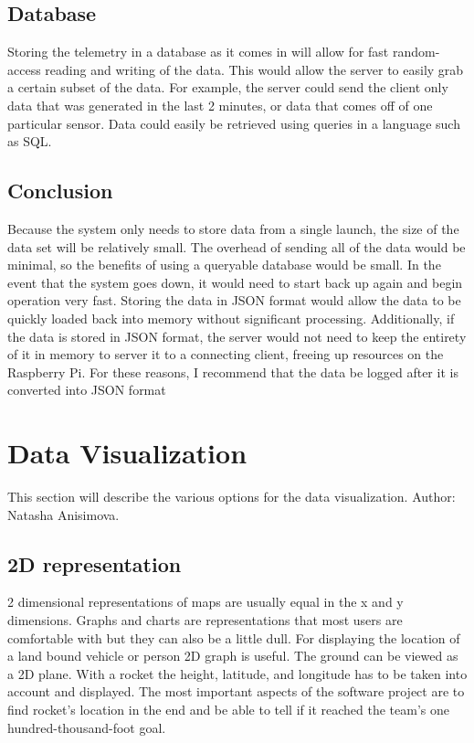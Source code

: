 \documentclass[10pt,draftclsnofoot,onecolumn]{IEEEtran}
\begin{document}
	\subsection{Database}
	Storing the telemetry in a database as it comes in will allow for fast random-access reading and writing of the data.
	This would allow the server to easily grab a certain subset of the data.
	For example, the server could send the client only data that was generated in the last 2 minutes, or data that comes off of one particular sensor.
	Data could easily be retrieved using queries in a language such as SQL.
	
	\subsection{Conclusion}
	Because the system only needs to store data from a single launch, the size of the data set will be relatively small.
	The overhead of sending all of the data would be minimal, so the benefits of using a queryable database would be small.
	In the event that the system goes down, it would need to start back up again and begin operation very fast.
	Storing the data in \ac{JSON} format would allow the data to be quickly loaded back into memory without significant processing.
	Additionally, if the data is stored in \ac{JSON} format, the server would not need to keep the entirety of it in memory to server it to a connecting client, freeing up resources on the Raspberry Pi.
	For these reasons, I recommend that the data be logged after it is converted into \ac{JSON} format

	\section{Data Visualization}
	This section will describe the various options for the data visualization. Author: Natasha Anisimova.
	
	\subsection{2D representation}
	2 dimensional representations of maps are usually equal in the x and y dimensions. 
	Graphs and charts are representations that most users are comfortable with but they can also be a little dull.
	For displaying the location of a land bound vehicle or person 2D graph is useful. 
	The ground can be viewed as a 2D plane. With a rocket the height, latitude, and longitude has to be taken into 
	account and displayed. 
	The most important aspects of the software project are to find rocket’s location in the end and be able to tell 
	if it reached the team’s one hundred-thousand-foot goal. 
	
\end{document}
